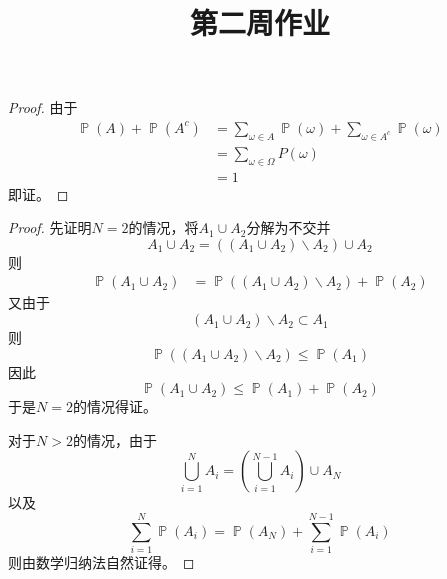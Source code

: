 \documentclass[cn]{homework}
\title{第二周作业}
\DeclareMathOperator{\prob}{\mathbb P}
\begin{document}
    \maketitle

    \problem
    \begin{subproblem}
        \item
        \begin{proof}
            由于
            \begin{align*}
                \prob(A)+\prob(A^c)&=
                \sum_{\omega\in A}\prob(\omega)+\sum_{\omega\in A^c}\prob(\omega)\\
                &=\sum_{\omega\in\Omega}P(\omega)\\
                &=1
            \end{align*}
            即证。
        \end{proof}

        \item
        \begin{proof}
            先证明$N=2$的情况，将$A_1\cup A_2$分解为不交并
            \[A_1\cup A_2=((A_1\cup A_2)\backslash A_2)\cup A_2\]
            则
            \begin{align*}
                \prob(A_1\cup A_2)&=\prob((A_1\cup A_2)\backslash A_2)
                +\prob(A_2)
            \end{align*}
            又由于
            \[(A_1\cup A_2)\backslash A_2\subset A_1\]
            则
            \[\prob((A_1\cup A_2)\backslash A_2)\leq\prob(A_1)\]
            因此
            \[\prob(A_1\cup A_2)\leq\prob(A_1)+\prob(A_2)\]
            于是$N=2$的情况得证。

            对于$N>2$的情况，由于
            \[\bigcup_{i=1}^NA_i=\left(\bigcup_{i=1}^{N-1}A_i\right)\cup A_N\]
            以及
            \[\sum_{i=1}^N\prob(A_i)=\prob(A_N)+\sum_{i=1}^{N-1}\prob(A_i)\]
            则由数学归纳法自然证得。
        \end{proof}
    \end{subproblem}
\end{document}
